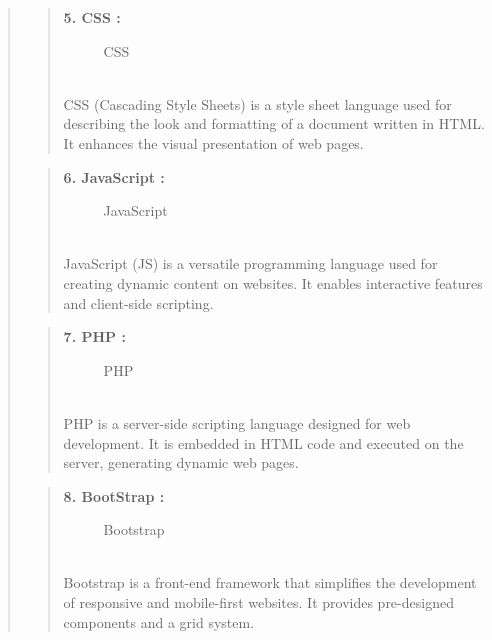 \documentclass[12pt]{report}
\begin{document}
\begin{quote}
		
		\begin{quote}
			\textbf{5. CSS :}
			\begin{figure}[h]
				\centering
				\caption{CSS}
				\vspace{0.5cm}
			\end{figure}
			\\CSS (Cascading Style Sheets) is a style sheet language used for describing the look and formatting of a document written in HTML. It enhances the visual presentation of web pages.
		\end{quote}
		
		\begin{quote}
			\textbf{6. JavaScript :}
			\begin{figure}[h]
				\centering
				\caption{JavaScript}
				\vspace{0.5cm}
			\end{figure}
			\\JavaScript (JS) is a versatile programming language used for creating dynamic content on websites. It enables interactive features and client-side scripting.
		\end{quote}
		\clearpage
		\begin{quote}
			\textbf{7. PHP :}
			\begin{figure}[h]
				\centering
				\caption{PHP}
				\vspace{0.5cm}
			\end{figure}
			\\PHP is a server-side scripting language designed for web development. It is embedded in HTML code and executed on the server, generating dynamic web pages.
		\end{quote}
		
		\begin{quote}
			\textbf{8. BootStrap :}
			\begin{figure}[h]
				\centering
				\caption{Bootstrap}
				\vspace{0.5cm}
			\end{figure}
			\\Bootstrap is a front-end framework that simplifies the development of responsive and mobile-first websites. It provides pre-designed components and a grid system.
		\end{quote}
	\end{quote}
	\clearpage
	
\end{document}
